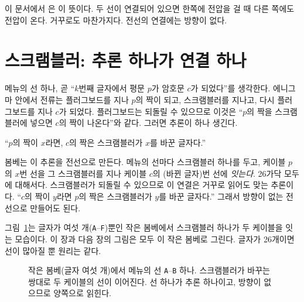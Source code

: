 이 문서에서 은 이 뜻이다. 두 선이 연결되어 있으면 한쪽에 전압을 걸 때 다른 쪽에도
전압이 온다. 거꾸로도 마찬가지다. 전선의 연결에는 방향이 없다.

\section{스크램블러: 추론 하나가 연결 하나}\label{sec:c-scrambler}

\Why 메뉴의 선 하나, 곧 ``$k$번째 글자에서 평문 $p$가 암호문 $c$가 되었다''를 생각한다. 에니그마 안에서 전류는
플러그보드를 지나 $p$의 짝이 되고, 스크램블러를 지나고, 다시 플러그보드를 지나 $c$가 되었다. 플러그보드는
되돌릴 수 있으므로 이것은 ``$p$의 짝을 스크램블러에 넣으면 $c$의 짝이 나온다''와 같다. 그러면 추론이 하나
생긴다.

\begin{center}
``$p$의 짝이 $x$라면, $c$의 짝은 스크램블러가 $x$를 바꾼 글자다.''
\end{center}

봄베는 이 추론을 전선으로 만든다. 메뉴의 선마다 스크램블러 하나를 두고, 케이블 $p$의 $x$번 선을 그
스크램블러를 지나 케이블 $c$의 (바뀐 글자)번 선에 \emph{잇는다}. 26가닥 모두에 대해서다. 스크램블러가
되돌릴 수 있으므로 이 연결은 거꾸로 읽어도 맞는 추론이다. ``$c$의 짝이 $y$라면 $p$의 짝은 스크램블러가 $y$를
바꾼 글자다.'' 그래서 방향이 없는 전선으로 만들어도 된다.

그림~\ref{fig:c-scr}는 글자가 여섯 개(\texttt{A}--\texttt{F})뿐인 작은 봄베에서 스크램블러 하나가 두 케이블을
잇는 모습이다. 이 장과 다음 장의 그림은 모두 이 작은 봄베로 그린다. 글자가 26개이면 선이 많아질 뿐 원리는 같다.

\begin{figure}[ht]
\centering
{}
\caption{작은 봄베(글자 여섯 개)에서 메뉴의 선 \texttt{A}--\texttt{B} 하나. 스크램블러가 바꾸는 쌍대로 두 케이블의
선이 이어진다. 선 하나가 추론 하나이고, 방향이 없으므로 양쪽으로 읽힌다.}
\label{fig:c-scr}
\end{figure}

